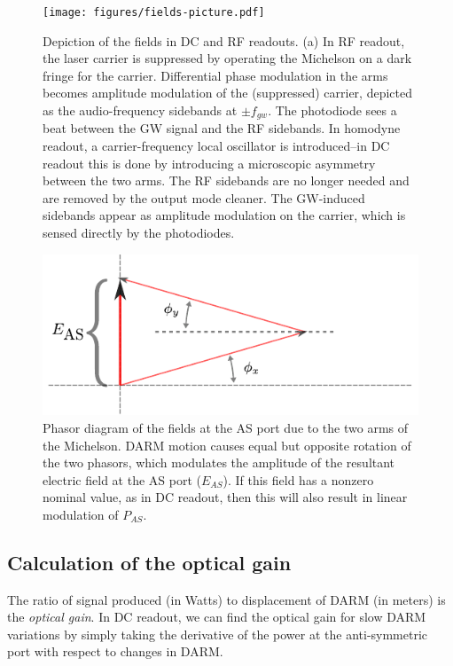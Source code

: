 \begin{figure}[p]
\texttt{[image: figures/fields-picture.pdf]}
\caption[Frequency-domain fields in DC and RF
  readouts]{\label{fig:sideband-picture}Depiction of the fields in DC
  and RF readouts.  (a) In RF readout, the laser carrier is suppressed
  by operating the Michelson on a dark fringe for the carrier.
  Differential phase modulation in the arms becomes amplitude
  modulation of the (suppressed) carrier, depicted as the
  audio-frequency sidebands at $\pm f_{gw}$.  The photodiode sees a
  beat between the GW signal and the RF sidebands.  In homodyne
  readout, a carrier-frequency local oscillator is introduced--in DC
  readout this is done by introducing a microscopic asymmetry between
  the two arms.  The RF sidebands are no longer needed and are removed
  by the output mode cleaner.  The GW-induced sidebands appear as
  amplitude modulation on the carrier, which is sensed directly by the
  photodiodes.}
\end{figure}

\begin{figure}[p]
\includegraphics[width=\columnwidth]{figures/phasors.pdf}
\caption[Phasor diagram of DC readout]{\label{fig:mich-phasors}Phasor
  diagram of the fields at the AS port due to the two arms of the
  Michelson.  DARM motion causes equal but opposite rotation of the
  two phasors, which modulates the amplitude of the resultant electric
  field at the AS port ($E_{AS}$).  If this field has a nonzero
  nominal value, as in DC readout, then this will also result in
  linear modulation of $P_{AS}$.}
\end{figure}

\subsection{Calculation of the optical gain}

The ratio of signal produced (in Watts) to displacement of DARM (in
meters) is the \emph{optical gain}.  In DC readout, we can find the
optical gain for slow DARM variations by simply taking the derivative
of the power at the anti-symmetric port with respect to changes in
DARM.

